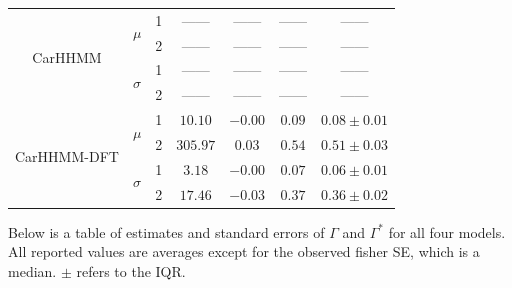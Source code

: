 \documentclass[12pt]{TD-CJS}
\begin{document}
{\begin{tabular}{ccccccc}
\multirow{4}{*}{CarHHMM}   & \multirow{2}{*}{$\mu$}        & 1                             & ------                         & ------                     & ------                             & ------                                      \\
                           &                               & 2                             & ------                         & ------                     & ------                             & ------                                      \\
                           & \multirow{2}{*}{$\sigma$}     & 1                             & ------                         & ------                     & ------                             & ------                                      \\
                           &                               & 2                             & ------                         & ------                     & ------                             & ------                                      \\ \hline
\multirow{4}{*}{CarHHMM-DFT}& \multirow{2}{*}{$\mu$}        & 1                             & $10.10$                         & $-0.00$                     & $0.09$                             & $0.08 \pm 0.01$                             \\
                           &                               & 2                             & $305.97$                         & $0.03$                     & $0.54$                             & $0.51 \pm 0.03$                             \\
                           & \multirow{2}{*}{$\sigma$}     & 1                             & $3.18$                         & $-0.00$                     & $0.07$                             & $0.06 \pm 0.01$                             \\
                           &                               & 2                             & $17.46$                         & $-0.03$                     & $0.37$                             & $0.36 \pm 0.02$                             
\end{tabular}
}

\newpage
Below is a table of estimates and standard errors of $\Gamma$ and $\Gamma^*$ for all four models. All reported values are averages except for the observed fisher SE, which is a median. $\pm$ refers to the IQR.
\vspace{1cm}
\end{document}
